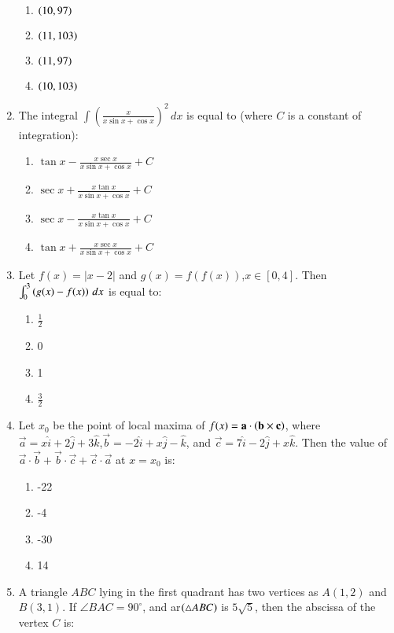 \documentclass[journal,12pt,twocolumn]{IEEEtran}
\theoremstyle{remark}
\begin{document}
\begin{enumerate}
\begin{multicols}{2}
\begin{enumerate}
    \item $\left(10, 97\right)$
    \item $\left(11, 103\right)$
    \item $\left(11, 97\right)$
    \item $\left(10,103\right)$
\end{enumerate}
\end{multicols}
\item The integral $\int\left(\frac{x}{x\sin x+\cos x}\right)^2\,dx$ is equal to (where $C$ is a constant of integration):
\begin{multicols}{2}
\begin{enumerate}
    \item $\tan x-\frac{x\sec x}{x\sin x+\cos x}+C$
    \item $\sec x+\frac{x\tan x}{x\sin x+\cos x}+C$
    \item $\sec x-\frac{x\tan x}{x\sin x+\cos x}+C$
    \item $\tan x+\frac{x\sec x}{x \sin x + \cos x}+C$
\end{enumerate}
\end{multicols}
\item Let $f(x)=|x-2|$ and $g(x)=f(f(x))$,$x\in [0, 4]$. Then $\int_0^3 \left(g(x)-f(x)\right)\, dx$ is equal to:
\begin{multicols}{2}
\begin{enumerate}
    \item $\frac{1}{2}$
    \item 0
    \item 1
    \item $\frac{3}{2}$
\end{enumerate}
\end{multicols}
\item Let $x_0$ be the point of local maxima of $f(x)=\mathbf{a}\cdot\left(\mathbf{b}\times\mathbf{c}\right)$, where $\vec{a}=x\hat{i}+2\hat{j}+3\hat{k}$,$\Vec{b}=-2\hat{i}+x\hat{j}-\hat{k}$, and $\vec{c}=7\hat{i}-2\hat{j}+x\hat{k}$. Then the value of $ \vec{a}\cdot\vec{b}+\vec{b}\cdot\vec{c}+\vec{c}\cdot\vec{a}$ at $x=x_0$ is:
\begin{multicols}{2}
\begin{enumerate}
    \item -22
    \item -4
    \item -30
    \item 14
\end{enumerate}
\end{multicols}
\item A triangle $ABC$ lying in the first quadrant has two vertices as $ A(1,2)$ and $B(3,1)$. If $\angle BAC=90^\circ$, and ar$\left(\triangle ABC\right)$ is $5\sqrt{5}$, then the abscissa of the vertex $C$ is:

\end{enumerate}
\end{document}
